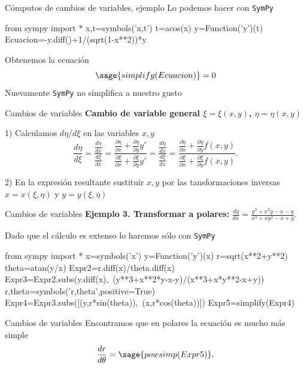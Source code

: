 \documentclass[handout,hyperref={colorlinks=true}]{beamer}
\begin{document}
\begin{frame}[fragile]{Cómputos de cambios de variables, ejemplo}
Lo podemos hacer con \texttt{SymPy}

\begin{sageblock}
from sympy import *
x,t=symbols('x,t')
t=acos(x)
y=Function('y')(t)
Ecuacion=-y.diff()+1/(sqrt(1-x**2))*y
\end{sageblock}
Obtenemos la ecuación
\[\sage{simplify(Ecuacion)}=0\]
Nuevamente \texttt{SymPy} no simplifica a nuestro gusto
\end{frame}

\begin{frame}{Cambios de variables}
\textbf{Cambio de variable general $\xi=\xi(x,y)$, $\eta=\eta(x,y)$}

1) Calculamos $d\eta/d\xi$ en las variables $x,y$
\begin{equation}\label{eq:subsder}
\frac{d\eta}{d\xi}=\frac{\frac{d\eta}{dx}}{\frac{d\xi}{dx}}=\frac{\frac{\partial\eta}{\partial x}+\frac{\partial\eta}{\partial y}y'}{\frac{\partial\xi}{\partial x}+\frac{\partial\xi}{\partial y}y'}=\frac{\frac{d\eta}{dx}}{\frac{d\xi}{dx}}=\frac{\frac{\partial\eta}{\partial x}+\frac{\partial\eta}{\partial y}f(x,y)}{\frac{\partial\xi}{\partial x}+\frac{\partial\xi}{\partial y}f(x,y)}.
\end{equation}

2) En la expresión resultante sustituir $x,y$ por las tansformaciones inversas $x=x(\xi,\eta)$ y  $y=y(\xi,\eta)$


\end{frame}


\begin{frame}[fragile]{Cambios de variables}
\textbf{Ejemplo 3. Transformar a polares:} $\frac{dy}{dx}=\frac{y^3+x^2y-x-y}{x^3+xy^2-x+y}.$

Dado que el cálculo es extenso lo haremos sólo con \texttt{SymPy}
\begin{sageblock}
from sympy import *
x=symbols('x')
y=Function('y')(x)
r=sqrt(x**2+y**2)
theta=atan(y/x)
Expr2=r.diff(x)/theta.diff(x)
Expr3=Expr2.subs(y.diff(x),\
(y**3+x**2*y-x-y)/(x**3+x*y**2-x+y))
r,theta=symbols('r,theta',positive=True)
Expr4=Expr3.subs([(y,r*sin(theta)),\
(x,r*cos(theta))])
Expr5=simplify(Expr4)
\end{sageblock}
\end{frame}

\begin{frame}[fragile]{Cambios de variables}
Encontramos que en polares la ecuación es mucho más simple
\[\frac{dr}{d\theta}=\sage{powsimp(Expr5)}.\]

\end{frame}
\end{document}
